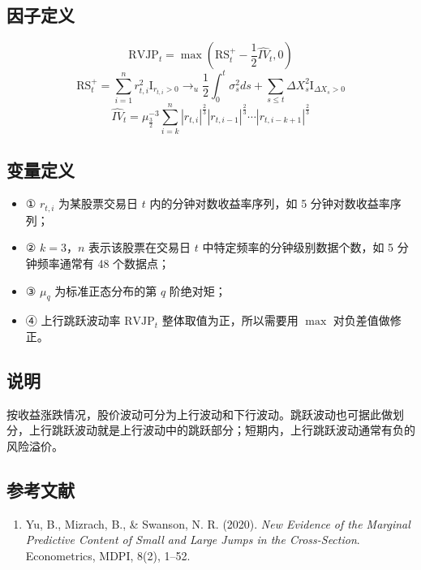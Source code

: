 \documentclass{article}
\begin{document}
\subsection{因子定义}
\begin{equation}
    \mathrm{RVJP}_t = \max\left(\mathrm{RS}_t^+ - \frac{1}{2} \hat{IV}_t, 0\right)
\end{equation}
\begin{equation}
    \mathrm{RS}_t^+ = \sum_{i=1}^{n} r_{t,i}^2 \mathrm{I}_{r_{t,i} > 0} \rightarrow_u \frac{1}{2} \int_0^t \sigma_s^2 ds + \sum_{s \leq t} \Delta X_s^2 \mathrm{I}_{\Delta X_s > 0}
\end{equation}
\begin{equation}
    \hat{IV}_t = \mu_{\frac{3}{2}}^{-3} \sum_{i=k}^{n} |r_{t,i}|^{\frac{2}{3}} |r_{t,i-1}|^{\frac{2}{3}} \cdots |r_{t,i-k+1}|^{\frac{2}{3}}
\end{equation}

\subsection{变量定义}
\begin{itemize}
    \item ① \( r_{t,i} \) 为某股票交易日 \( t \) 内的分钟对数收益率序列，如 5 分钟对数收益率序列；
    \item ② \( k=3 \)，\( n \) 表示该股票在交易日 \( t \) 中特定频率的分钟级别数据个数，如 5 分钟频率通常有 48 个数据点；
    \item ③ \( \mu_q \) 为标准正态分布的第 \( q \) 阶绝对矩；
    \item ④ 上行跳跃波动率 \( \mathrm{RVJP}_t \) 整体取值为正，所以需要用 \( \max \) 对负差值做修正。
\end{itemize}

\subsection{说明}
按收益涨跌情况，股价波动可分为上行波动和下行波动。跳跃波动也可据此做划分，上行跳跃波动就是上行波动中的跳跃部分；短期内，上行跳跃波动通常有负的风险溢价。

\subsection{参考文献}
\begin{enumerate}
    \item Yu, B., Mizrach, B., \& Swanson, N. R. (2020). \textit{New Evidence of the Marginal Predictive Content of Small and Large Jumps in the Cross-Section}. Econometrics, MDPI, 8(2), 1–52.
\end{enumerate}
\end{document}
